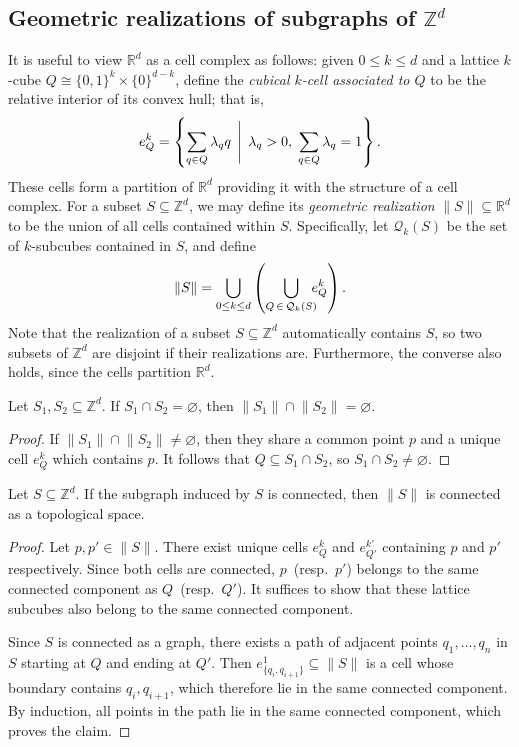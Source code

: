 \subsection{Geometric realizations of subgraphs of $\mathbb{Z}^d$}
It is useful to view $\mathbb{R}^d$ as a cell complex as follows:
given $0 \leq k \leq d$ and a lattice $k$-cube $Q \cong \{0,1\}^k \times \{0\}^{d-k}$, define the \emph{cubical $k$-cell associated to $Q$} to be the relative interior of its convex hull; that is,
\begin{equation}
  e^k_{Q} = \left\{ \sum_{q \in Q} \lambda_q q \,\Biggm|\, \lambda_q > 0,\; \sum_{q \in Q} \lambda_q = 1 \right\}.
\end{equation}
These cells form a partition of $\mathbb{R}^d$ providing it with the structure of a cell complex. 
For a subset $S \subseteq \mathbb{Z}^d$, we may define its \emph{geometric realization} $\lVert S \rVert \subseteq \mathbb{R}^d$  to be the union of all cells contained within $S$.
Specifically, let $\mathcal{Q}_k(S)$ be the set of $k$-subcubes contained in $S$, and define
\begin{equation}
  \lVert S \rVert = \bigcup_{0 \leq k \leq d}\left(\bigcup_{Q \,\in \, \mathcal{Q}_k(S)} \mskip -10mu e^k_Q \right).
\end{equation}
Note that the realization of a subset $S \subseteq \mathbb{Z}^d$ automatically contains $S$, so two subsets of $\mathbb{Z}^d$ are disjoint if their realizations are. Furthermore, the converse also holds, since the cells partition $\mathbb{R}^d$.
\begin{proposition}\label{prop:real-disjoint}
Let $S_1, S_2 \subseteq \mathbb{Z}^d$. If $S_1 \cap S_2 = \varnothing$, then $\lVert S_1 \rVert \cap \lVert S_2 \rVert = \varnothing$.
\end{proposition}
\begin{proof}
  If $\lVert S_1 \rVert \cap \lVert S_2 \rVert \neq \varnothing$, then they share a common point $p$ and a unique cell $e^k_Q$ which contains $p$. It follows that $Q \subseteq S_1 \cap S_2$, so $S_1 \cap S_2 \neq \varnothing$.
\end{proof}
\begin{proposition}\label{prop:real-connected}
  Let $S \subseteq \mathbb{Z}^d$.
  If the subgraph induced by $S$ is connected, then $\lVert S \rVert$ is connected as a topological space.
\end{proposition}
\begin{proof}
  Let $p, p' \in \lVert S \rVert$.
  There exist unique cells $e^{k}_{Q}$ and $e^{k'}_{Q'}$ containing $p$ and $p'$ respectively.
  Since both cells are connected, {$p$~(resp.~$p'$)} belongs to the same connected component as {$Q$~(resp.~$Q'$)}. 
  It suffices to show that these lattice subcubes also belong to the same connected component.

  Since $S$ is connected as a graph, there exists a path of adjacent points $q_1, \ldots, q_n$ in $S$ starting at $Q$ and ending at $Q'$.
  Then $e^1_{\{q_i, q_{i+1}\}} \subseteq \lVert S \rVert$ is a cell whose boundary contains $q_i, q_{i+1}$, which therefore lie in the same connected component. By induction, all points in the path lie in the same connected component, which proves the claim. 
\end{proof}
